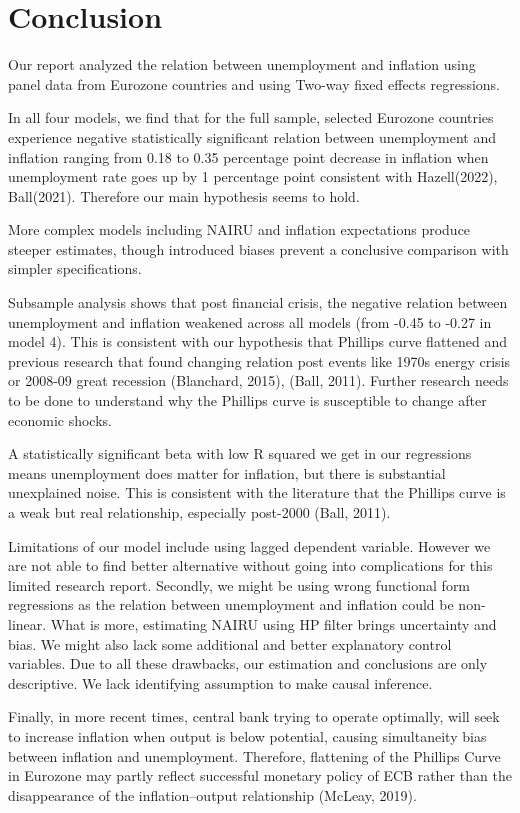 \documentclass[preprint,10pt,authoryear]{elsarticle}
\begin{document}
\section{Conclusion}

Our report analyzed the relation between unemployment and inflation using panel data from Eurozone countries and using Two-way fixed effects regressions.

In all four models, we find that for the full sample, selected Eurozone countries experience negative statistically significant relation between unemployment and inflation ranging from 0.18 to 0.35 percentage point decrease in inflation when unemployment rate goes up by 1 percentage point consistent with Hazell(2022), Ball(2021). Therefore our main hypothesis seems to hold.

More complex models including NAIRU and inflation expectations produce steeper estimates, though introduced biases prevent a conclusive comparison with simpler specifications.


Subsample analysis shows that post financial crisis, the negative relation between unemployment and inflation weakened across all models (from -0.45 to -0.27 in model 4). This is consistent with our hypothesis that Phillips curve flattened and previous research that found changing relation post events like 1970s energy crisis or 2008-09 great recession  (Blanchard, 2015), (Ball, 2011). Further research needs to be done to understand why the Phillips curve is susceptible to change after economic shocks.

A statistically significant beta with low R squared we get in our regressions means unemployment does matter for inflation, but there is substantial unexplained noise. This is consistent with the literature that the Phillips curve is a weak but real relationship, especially post-2000 (Ball, 2011). 

Limitations of our model include using lagged dependent variable. However we are not able to find better alternative without going into complications for this limited research report. Secondly, we might be using wrong functional form regressions as the relation between unemployment and inflation could be non-linear. What is more, estimating NAIRU using HP filter brings uncertainty and bias. We might also lack some additional and better explanatory control variables. Due to all these drawbacks, our estimation and conclusions are only descriptive. We lack identifying assumption to make causal inference.

Finally, in more recent times, central bank trying to operate optimally, will seek to increase inflation when output is below potential, causing simultaneity bias between inflation and unemployment. Therefore,  flattening of the Phillips Curve in Eurozone may partly reflect successful monetary policy of ECB rather than the disappearance of the inflation–output relationship (McLeay, 2019).
\end{document}
